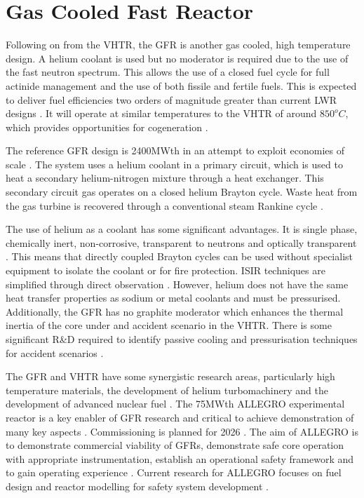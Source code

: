 \documentclass[journal]{IEEEtran}
\begin{document}
\section{Gas Cooled Fast Reactor}
Following on from the VHTR, the GFR is another gas cooled, high temperature design.
A helium coolant is used but no moderator is required due to the use of the fast neutron spectrum.
This allows the use of a closed fuel cycle for full actinide management and the use of both fissile and fertile fuels.
This is expected to deliver fuel efficiencies two orders of magnitude greater than current LWR designs \cite{GenIVRoadmap}.
It will operate at similar temperatures to the VHTR of around $850^oC$, which provides opportunities for cogeneration \cite{Bhatnagar2011}.

The reference GFR design is 2400MWth in an attempt to exploit economies of scale \cite{Locatelli2013}.
The system uses a helium coolant in a primary circuit, which is used to heat a secondary helium-nitrogen mixture through a heat exchanger.
This secondary circuit gas operates on a closed helium Brayton cycle.
Waste heat from the gas turbine is recovered through a conventional steam Rankine cycle \cite{GenIVForum}.

The use of helium as a coolant has some significant advantages.
It is single phase, chemically inert, non-corrosive, transparent to neutrons and optically transparent \cite{Int2012}.
This means that directly coupled Brayton cycles can be used without specialist equipment to isolate the coolant or for fire protection.
ISIR techniques are simplified through direct observation \cite{Locatelli2013}.
However, helium does not have the same heat transfer properties as sodium or metal coolants and must be pressurised.
Additionally, the GFR has no graphite moderator which enhances the thermal inertia of the core under and accident scenario in the VHTR.
There is some significant R\&D required to identify passive cooling and pressurisation techniques for accident scenarios \cite{Int2012}.

The GFR and VHTR have some synergistic research areas, particularly high temperature materials, the development of helium turbomachinery and the development of advanced nuclear fuel \cite{Locatelli2013}. 
The 75MWth ALLEGRO experimental reactor is a key enabler of GFR research and critical to achieve demonstration of many key aspects \cite{Int2012}.
Commissioning is planned for 2026 \cite{Locatelli2013}.
The aim of ALLEGRO is to demonstrate commercial viability of GFRs, demonstrate safe core operation with appropriate instrumentation, establish an operational safety framework and to gain operating experience \cite{Int2012}.
Current research for ALLEGRO focuses on fuel design and reactor modelling for safety system development \cite{GenIVForum}.
\end{document}
